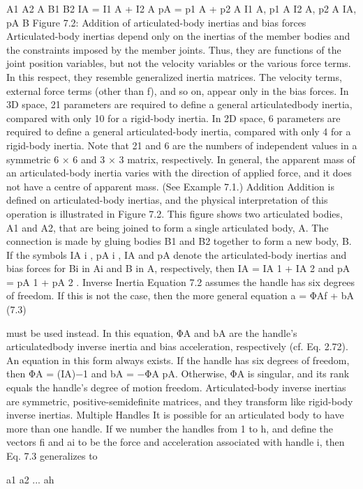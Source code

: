 A1 A2 A B1 B2 IA = I1 A + I2 A pA = p1 A + p2 A I1 A, p1 A I2 A, p2 A IA, pA B Figure 7.2: Addition of articulated-body inertias and bias forces Articulated-body inertias depend only on the inertias of the member bodies and the constraints imposed by the member joints. Thus, they are functions of the joint position variables, but not the velocity variables or the various force terms. In this respect, they resemble generalized inertia matrices. The velocity terms, external force terms (other than f), and so on, appear only in the bias forces. In 3D space, 21 parameters are required to define a general articulatedbody inertia, compared with only 10 for a rigid-body inertia. In 2D space, 6 parameters are required to define a general articulated-body inertia, compared with only 4 for a rigid-body inertia. Note that 21 and 6 are the numbers of independent values in a symmetric 6 × 6 and 3 × 3 matrix, respectively. In general, the apparent mass of an articulated-body inertia varies with the direction of applied force, and it does not have a centre of apparent mass. (See Example 7.1.) Addition Addition is defined on articulated-body inertias, and the physical interpretation of this operation is illustrated in Figure 7.2. This figure shows two articulated bodies, A1 and A2, that are being joined to form a single articulated body, A. The connection is made by gluing bodies B1 and B2 together to form a new body, B. If the symbols IA i , pA i , IA and pA denote the articulated-body inertias and bias forces for Bi in Ai and B in A, respectively, then IA = IA 1 + IA 2 and pA = pA 1 + pA 2 . Inverse Inertia Equation 7.2 assumes the handle has six degrees of freedom. If this is not the case, then the more general equation a = ΦAf + bA (7.3)

must be used instead. In this equation, ΦA and bA are the handle’s articulatedbody inverse inertia and bias acceleration, respectively (cf. Eq. 2.72). An equation in this form always exists. If the handle has six degrees of freedom, then ΦA = (IA)−1 and bA = −ΦA pA. Otherwise, ΦA is singular, and its rank equals the handle’s degree of motion freedom. Articulated-body inverse inertias are symmetric, positive-semidefinite matrices, and they transform like rigid-body inverse inertias. Multiple Handles It is possible for an articulated body to have more than one handle. If we number the handles from 1 to h, and define the vectors fi and ai to be the force and acceleration associated with handle i, then Eq. 7.3 generalizes to

a1 a2 ... ah

